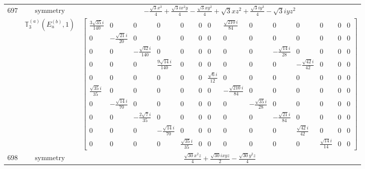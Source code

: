 \documentclass[fleqn,8pt,landscape]{jsarticle}
\begin{document}
\begin{longtable}{ccc}
$ 697 $ & $ \text{symmetry} $ & $ - \frac{\sqrt{3} x^{3}}{4} + \frac{\sqrt{3} i x^{2} y}{4} - \frac{\sqrt{3} x y^{2}}{4} + \sqrt{3} x z^{2} + \frac{\sqrt{3} i y^{3}}{4} - \sqrt{3} i y z^{2} $ \\
$  $ & $ \mathbb{T}_{3}^{(a)}(E_{u}^{(b)},1) $ & $ \begin{bmatrix} \frac{3 \sqrt{35} i}{140} & 0 & 0 & 0 & 0 & 0 & 0 & \frac{\sqrt{210} i}{84} & 0 & 0 & 0 & 0 & 0 & 0 \\ 0 & - \frac{\sqrt{21} i}{20} & 0 & 0 & 0 & 0 & 0 & 0 & 0 & 0 & 0 & 0 & 0 & 0 \\ 0 & 0 & - \frac{\sqrt{42} i}{140} & 0 & 0 & 0 & 0 & 0 & 0 & - \frac{\sqrt{14} i}{28} & 0 & 0 & 0 & 0 \\ 0 & 0 & 0 & \frac{9 \sqrt{14} i}{140} & 0 & 0 & 0 & 0 & 0 & 0 & - \frac{\sqrt{42} i}{42} & 0 & 0 & 0 \\ 0 & 0 & 0 & 0 & 0 & 0 & \frac{\sqrt{6} i}{12} & 0 & 0 & 0 & 0 & 0 & 0 & 0 \\ \frac{\sqrt{35} i}{35} & 0 & 0 & 0 & 0 & 0 & 0 & - \frac{\sqrt{210} i}{84} & 0 & 0 & 0 & 0 & 0 & 0 \\ 0 & - \frac{\sqrt{14} i}{70} & 0 & 0 & 0 & 0 & 0 & 0 & - \frac{\sqrt{35} i}{28} & 0 & 0 & 0 & 0 & 0 \\ 0 & 0 & - \frac{2 \sqrt{7} i}{35} & 0 & 0 & 0 & 0 & 0 & 0 & - \frac{\sqrt{21} i}{84} & 0 & 0 & 0 & 0 \\ 0 & 0 & 0 & - \frac{\sqrt{14} i}{70} & 0 & 0 & 0 & 0 & 0 & 0 & \frac{\sqrt{42} i}{42} & 0 & 0 & 0 \\ 0 & 0 & 0 & 0 & \frac{\sqrt{35} i}{35} & 0 & 0 & 0 & 0 & 0 & 0 & \frac{\sqrt{14} i}{14} & 0 & 0 \end{bmatrix} $ \\ \hline
$ 698 $ & $ \text{symmetry} $ & $ \frac{\sqrt{30} x^{2} z}{4} + \frac{\sqrt{30} i x y z}{2} - \frac{\sqrt{30} y^{2} z}{4} $ \\

\end{longtable}
\end{document}
